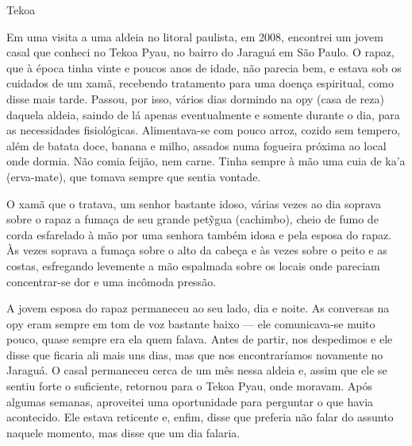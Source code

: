Tekoa

Em uma visita a uma aldeia no litoral paulista, em 2008, encontrei um
jovem casal que conheci no Tekoa Pyau, no bairro do Jaraguá em São
Paulo. O rapaz, que à época tinha vinte e poucos anos de idade, não
parecia bem, e estava sob os cuidados de um xamã, recebendo tratamento
para uma doença espiritual, como disse mais tarde. Passou, por isso,
vários dias dormindo na opy (casa de reza) daquela aldeia, saindo de lá
apenas eventualmente e somente durante o dia, para as necessidades
fisiológicas. Alimentava-se com pouco arroz, cozido sem tempero, além
de batata doce, banana e milho, assados numa fogueira próxima ao local
onde dormia. Não comia feijão, nem carne. Tinha sempre à mão uma cuia
de ka’a (erva-mate), que tomava sempre que sentia vontade. 

O xamã que o tratava, um senhor bastante idoso, várias vezes ao dia
soprava sobre o rapaz a fumaça de seu grande pet\~{y}gua (cachimbo),
cheio de fumo de corda esfarelado à mão por uma senhora também idosa e
pela esposa do rapaz. Às vezes soprava a fumaça sobre o alto da cabeça
e às vezes sobre o peito e as costas, esfregando levemente a mão
espalmada sobre os locais onde pareciam concentrar-se dor e uma
incômoda pressão.

A jovem esposa do rapaz permaneceu ao seu lado, dia e noite. As
conversas na opy eram sempre em tom de voz bastante baixo --- ele
comunicava-se muito pouco, quase sempre era ela quem falava. Antes de
partir, nos despedimos e ele disse que ficaria ali mais uns dias, mas
que nos encontraríamos novamente no Jaraguá. O casal permaneceu cerca
de um mês nessa aldeia e, assim que ele se sentiu forte o suficiente,
retornou para o Tekoa Pyau, onde moravam. Após algumas semanas,
aproveitei uma oportunidade para perguntar o que havia acontecido. Ele
estava reticente e, enfim, disse que preferia não falar do assunto
naquele momento, mas disse que um dia falaria.

